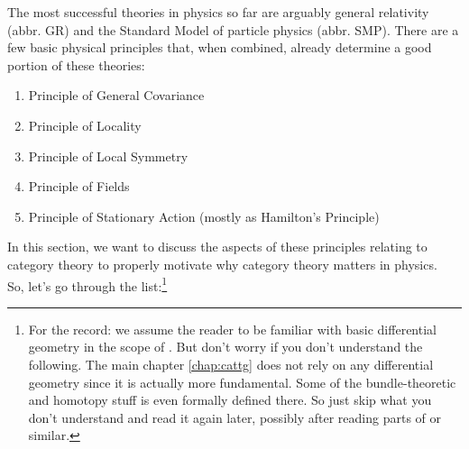 The most successful theories in physics so far are arguably general relativity (abbr. GR) and the Standard Model of particle physics (abbr. SMP).
There are a few basic physical principles that, when combined, already determine a good portion of these theories:
\begin{enumerate}
\item[$\bullet$]
Principle of General Covariance
\item[$\bullet$]
Principle of Locality
\item[$\bullet$]
Principle of Local Symmetry
\item[$\bullet$]
Principle of Fields
\item[$\bullet$]
Principle of Stationary Action (mostly as Hamilton's Principle)
\end{enumerate}
In this section, we want to discuss the aspects of these principles relating to category theory to properly motivate why category theory matters in physics.
\\
So, let's go through the list:\footnote{For the record: we assume the reader to be familiar with basic differential geometry in the scope of \cite{797789bc}.
But don't worry if you don't understand the following.
The main chapter \ref{chap:cattg} does not rely on any differential geometry since it is actually more fundamental.
Some of the bundle-theoretic and homotopy stuff is even formally defined there.
So just skip what you don't understand and read it again later, possibly after reading parts of \cite{797789bc} or similar.}
